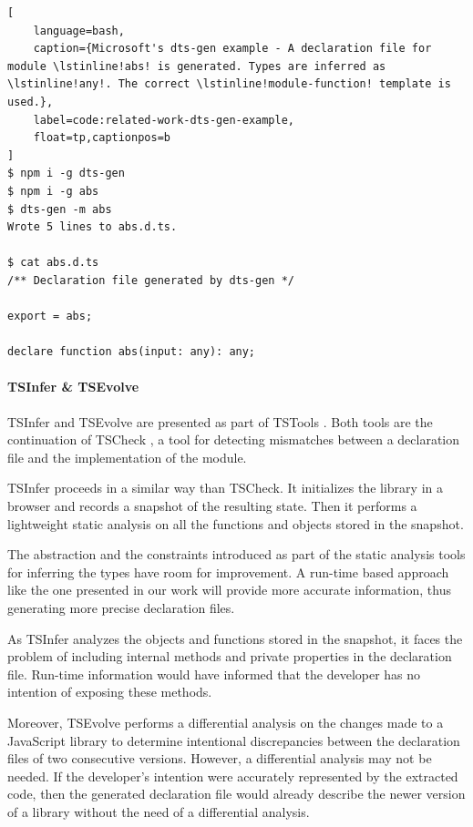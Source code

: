 \documentclass[english,cleveref,autoref,submission]{programming}
\begin{document}

\begin{lstlisting}[
    language=bash,
    caption={Microsoft's dts-gen example - A declaration file for module \lstinline!abs! is generated. Types are inferred as \lstinline!any!. The correct \lstinline!module-function! template is used.},
	label=code:related-work-dts-gen-example,
    float=tp,captionpos=b
]
$ npm i -g dts-gen
$ npm i -g abs
$ dts-gen -m abs
Wrote 5 lines to abs.d.ts.

$ cat abs.d.ts
/** Declaration file generated by dts-gen */

export = abs;

declare function abs(input: any): any;
\end{lstlisting}

\paragraph*{TSInfer \& TSEvolve}
TSInfer and TSEvolve are presented as part of TSTools
\cite{DBLP:conf/fase/KristensenM17}. Both tools are the continuation of TSCheck
\cite{DBLP:conf/oopsla/FeldthausM14}, a tool for detecting mismatches between a
declaration file and the implementation of the module. 

TSInfer proceeds in a similar way than TSCheck. It initializes the library in a browser
and records a snapshot of the resulting state.  Then it performs a lightweight static
analysis on all the functions and objects stored in the snapshot. 

The abstraction and the constraints introduced as part of the static analysis tools
for inferring the types have room for improvement. A run-time based approach like the one
presented in our work will provide more accurate information, thus generating more precise
declaration files.

As TSInfer analyzes the objects and functions stored in the snapshot, it faces the problem
of including internal methods and private properties in the declaration file. Run-time
information would have informed that the developer has no intention of exposing these
methods. 

Moreover, TSEvolve performs a differential analysis on the changes made to a JavaScript
library to determine intentional discrepancies between the declaration files of two
consecutive versions. However, a differential analysis may not be needed. If the
developer's intention were accurately represented by the extracted code, then the generated
declaration file would already describe the newer version of a library without the need of
a differential analysis.
\end{document}
